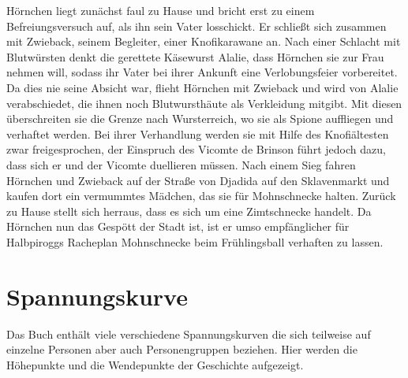 {Hörnchen liegt zunächst faul zu Hause und bricht erst zu einem Befreiungsversuch auf, als ihn sein Vater losschickt. Er schließt sich zusammen mit Zwieback, seinem Begleiter, einer Knofikarawane an. Nach einer Schlacht mit Blutwürsten denkt die gerettete Käsewurst Alalie, dass Hörnchen sie zur Frau nehmen will, sodass ihr Vater bei ihrer Ankunft eine Verlobungsfeier vorbereitet. Da dies nie seine Absicht war, flieht Hörnchen mit Zwieback und wird von Alalie verabschiedet, die ihnen noch Blutwursthäute als Verkleidung mitgibt. Mit diesen überschreiten sie die Grenze nach Wursterreich, wo sie als Spione auffliegen und verhaftet werden. Bei ihrer Verhandlung werden sie mit Hilfe des Knofiältesten zwar freigesprochen, der Einspruch des Vicomte de Brinson führt jedoch dazu, dass sich er und der Vicomte duellieren müssen. Nach einem Sieg fahren Hörnchen und Zwieback auf der Straße von Djadida auf den Sklavenmarkt und kaufen dort ein vermummtes Mädchen, das sie für Mohnschnecke halten. Zurück zu Hause stellt sich herraus, dass es sich um eine Zimtschnecke handelt. Da Hörnchen nun das Gespött der Stadt ist, ist er umso empfänglicher für Halbpiroggs Racheplan Mohnschnecke beim Frühlingsball verhaften zu lassen.


\section{Spannungskurve}

Das Buch enthält viele verschiedene Spannungskurven die sich teilweise auf einzelne Personen aber auch Personengruppen beziehen. Hier werden die Höhepunkte und die Wendepunkte der Geschichte aufgezeigt.

}
